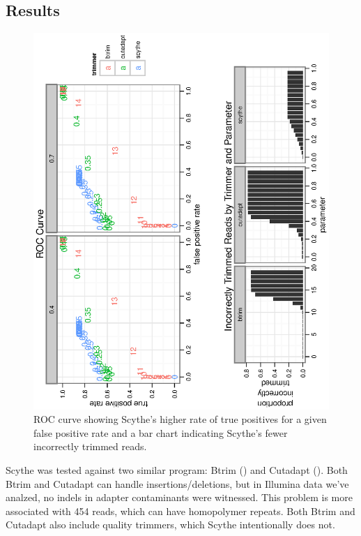 \documentclass{bioinfo}
\begin{document}
\begin{methods}
\section{Results}
\begin{centering}
\begin{figure}[!tpb]
\includegraphics[angle=-90]{graphics/roc-and-incorrect-trimmed.eps}
\caption{ROC curve showing Scythe's higher rate of true positives for
  a given false positive rate and a bar chart indicating Scythe's
  fewer incorrectly trimmed reads.}\label{fig:02}
\end{figure}
\end{centering}

Scythe was tested against two similar program: Btrim
(\citealp{pmid21651976}) and Cutadapt (\citealp{EJ200}). Both
Btrim and Cutadapt can handle insertions/deletions, but in Illumina
data we've analzed, no indels in adapter contaminants were
witnessed. This problem is more associated with 454 reads, which can
have homopolymer repeats. Both Btrim and Cutadapt also include quality
trimmers, which Scythe intentionally does not.


\end{methods}
\end{document}
